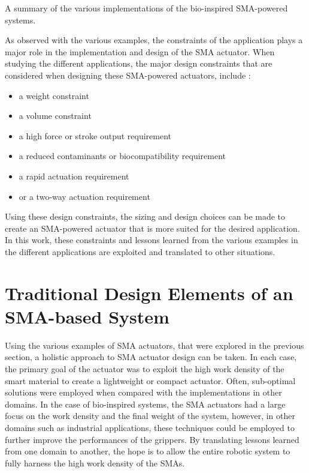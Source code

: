 \begin{table}[hbt]
    \centering
    \caption{A summary of the various implementations of the bio-inspired SMA-powered systems.}
    
    \label{tab:bioinspired-subsystems-examples}
\end{table}

As observed with the various examples, the constraints of the application plays a major role in the implementation and design of the SMA actuator. When studying the different applications, the major design constraints that are considered when designing these SMA-powered actuators, include :
\begin{itemize}
    \item a weight constraint
    \item a volume constraint
    \item a high force or stroke output requirement
    \item a reduced contaminants or biocompatibility requirement
    \item a rapid actuation requirement
    \item or a two-way actuation requirement
\end{itemize}
Using these design constraints, the sizing and design choices can be made to create an SMA-powered actuator that is more suited for the desired application. In this work, these constraints and lessons learned from the various examples in the different applications are exploited and translated to other situations.

\section{Traditional Design Elements of an SMA-based System}
Using the various examples of SMA actuators, that were explored in the previous section, a holistic approach to SMA actuator design can be taken. In each case, the primary goal of the actuator was to exploit the high work density of the smart material to create a lightweight or compact actuator. Often, sub-optimal solutions were employed when compared with the implementations in other domains. In the case of bio-inspired systems, the SMA actuators had a large focus on the work density and the final weight of the system, however, in other domains such as industrial applications, these techniques could be employed to further improve the performances of the grippers. By translating lessons learned from one domain to another, the hope is to allow the entire robotic system to fully harness the high work density of the SMAs.

